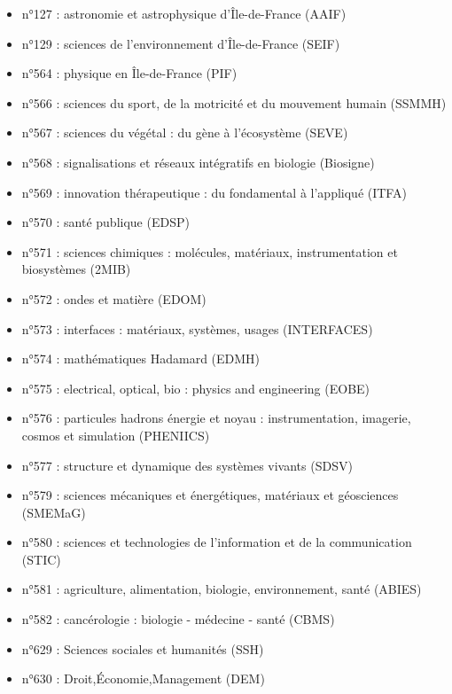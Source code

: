\documentclass[main=french,a4paper]{book}
\begin{document}
\begin{itemize}
\renewcommand{\labelitemi}{$\bullet$}
\item n°127 : astronomie et astrophysique d'Île-de-France (AAIF)
\item n°129 : sciences de l'environnement d’Île-de-France (SEIF)
\item n°564 : physique en Île-de-France (PIF)
\item n°566 : sciences du sport, de la motricité et du mouvement humain (SSMMH)
\item n°567 : sciences du végétal : du gène à l'écosystème (SEVE)
\item n°568 : signalisations et réseaux intégratifs en biologie (Biosigne)
\item n°569 : innovation thérapeutique : du fondamental à l'appliqué (ITFA)
\item n°570 : santé publique (EDSP)
\item n°571 : sciences chimiques : molécules, matériaux, instrumentation et biosystèmes (2MIB)
\item n°572 : ondes et matière (EDOM)
\item n°573 : interfaces : matériaux, systèmes, usages (INTERFACES)
\item n°574 : mathématiques Hadamard (EDMH)
\item n°575 : electrical, optical, bio : physics and engineering  (EOBE)
\item n°576 : particules hadrons énergie et noyau : instrumentation, imagerie, cosmos et simulation (PHENIICS)
\item n°577 : structure et dynamique des systèmes vivants (SDSV)
\item n°579 : sciences mécaniques et énergétiques, matériaux et géosciences  (SMEMaG)
\item n°580 : sciences et technologies de l'information et de la communication (STIC)
\item n°581 : agriculture, alimentation, biologie, environnement, santé (ABIES)
\item n°582 : cancérologie : biologie - médecine - santé (CBMS)
\item n°629 : Sciences sociales et humanités (SSH)
\item n°630 : Droit,Économie,Management (DEM)
\end{itemize}
\end{document}
